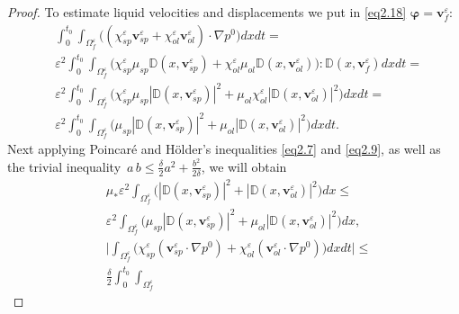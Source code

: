 \documentclass{article}
\theoremstyle{plain}
\theoremstyle{definition}
\numberwithin{equation}{section}
\begin{document}
\begin{proof}
To estimate liquid velocities and displacements we put in \eqref{eq2.18} $\boldsymbol{\varphi}=\boldsymbol{v}^{\varepsilon}_{f}$:
\begin{equation}\label{eq4.2}
\begin{aligned}
& 
\int_{0}^{t_{0}}\int_{\Omega^{\varepsilon}_{f}}\big((\chi^{\varepsilon}_{sp}
\boldsymbol{v}^{\varepsilon}_{sp}+\chi^{\varepsilon}_{ol}\boldsymbol{v}^{\varepsilon}_{ol})
\cdot\nabla{p}^{0}\big)dxdt=
\\
& \varepsilon^{2}\int_{0}^{t_{0}}\int_{\Omega^{\varepsilon}_{f}}\big(\chi^{\varepsilon}_{sp}
\mu_{sp}\mathbb{D}(x,\boldsymbol{v}^{\varepsilon}_{sp})+\chi^{\varepsilon}_{ol}
\mu_{ol}\mathbb{D}(x,\boldsymbol{v}^{\varepsilon}_{ol})\big):
\mathbb{D}(x,\boldsymbol{v}^{\varepsilon}_{f})dxdt=
\\
& \varepsilon^{2}\int_{0}^{t_{0}}\int_{\Omega^{\varepsilon}_{f}}\big(\chi^{\varepsilon}_{sp}\mu_{sp}
|\mathbb{D}(x,\boldsymbol{v}^{\varepsilon}_{sp})|^{2}+\mu_{ol}\chi^{\varepsilon}_{ol}
|\mathbb{D}(x,\boldsymbol{v}^{\varepsilon}_{ol})|^{2}\big)dxdt=
\\
& \varepsilon^{2}\int_{0}^{t_{0}}\int_{\Omega^{\varepsilon}_{f}}\big(\mu_{sp}
|\mathbb{D}(x,\boldsymbol{v}^{\varepsilon}_{sp})|^{2}+\mu_{ol}
|\mathbb{D}(x,\boldsymbol{v}^{\varepsilon}_{ol})|^{2}\big)dxdt.
\end{aligned}
\end{equation}
Next applying Poincar\'{e} and H\"{o}lder's inequalities \eqref{eq2.7} and \eqref{eq2.9}, as well as the trivial inequality $\displaystyle\,{a}\,{b}\leqslant\frac{\delta}{2}{a}^{2}+\frac{{b}^{2}}{2\delta}$, we will obtain
\begin{equation}\label{eq4.3}
\begin{aligned}
& 
\mu_{*}\varepsilon^{2}\int_{\Omega^{\varepsilon}_{f}}
\big(|\mathbb{D}(x,\boldsymbol{v}^{\varepsilon}_{sp})|^{2}+
|\mathbb{D}(x,\boldsymbol{v}^{\varepsilon}_{ol})|^{2}\big)dx\leqslant
\\
& \varepsilon^{2}\int_{\Omega^{\varepsilon}_{f}}
\big(\mu_{sp}|\mathbb{D}(x,\boldsymbol{v}^{\varepsilon}_{sp})|^{2}+\mu_{ol}
|\mathbb{D}(x,\boldsymbol{v}^{\varepsilon}_{ol})|^{2}\big)dx,
\\
& \Big|\int_{\Omega^{\varepsilon}_{f}}\Big(\chi^{\varepsilon}_{sp}
(\boldsymbol{v}^{\varepsilon}_{sp}\cdot\nabla{p}^{0})+
\chi^{\varepsilon}_{ol}(\boldsymbol{v}^{\varepsilon}_{ol}\cdot\nabla{p}^{0})\Big)dxdt\Big|\leqslant
\\
& \frac{\delta}{2}\int_{0}^{t_{0}}\int_{\Omega^{\varepsilon}_{f}}

\end{aligned}
\end{equation}
\end{proof}
\end{document}
